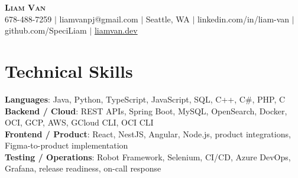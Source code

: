 \documentclass[letterpaper,11pt]{article}
\begin{document}

%
\begin{center}
    \textbf{\Huge \scshape Liam Van} \\ \vspace{1pt}
    \small 678-488-7259 $|$ liamvanpj@gmail.com $|$ Seattle, WA $|$
    linkedin.com/in/liam-van $|$ github.com/SpeciLiam $|$ \href{https://liamvan.dev}{liamvan.dev}

\end{center}

\section{Technical Skills}
 \begin{itemize}[leftmargin=0.15in, label={}]
    \small{\item{
     \textbf{Languages}{: Java, Python, TypeScript, JavaScript, SQL, C++, C\#, PHP, C} \\
     \textbf{Backend / Cloud}{: REST APIs, Spring Boot, MySQL, OpenSearch, Docker, OCI, GCP, AWS, GCloud CLI, OCI CLI} \\
     \textbf{Frontend / Product}{: React, NestJS, Angular, Node.js, product integrations, Figma-to-product implementation} \\
     \textbf{Testing / Operations}{: Robot Framework, Selenium, CI/CD, Azure DevOps, Grafana, release readiness, on-call response} \\
    }}
 \end{itemize}
%

\end{document}
